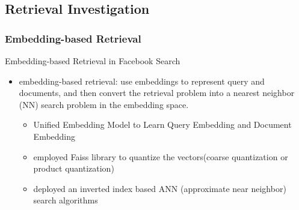 \documentclass{beamer}
\begin{document}
\subsection{Retrieval Investigation}
\subsubsection{Embedding-based Retrieval}

\begin{frame}{Embedding-based Retrieval in Facebook Search}
    \begin{itemize}
    \item embedding-based retrieval: use embeddings to represent query and documents, and then convert the retrieval problem into a nearest neighbor (NN) search problem in the embedding space.
        \begin{itemize} 
            \item Unified Embedding Model to Learn Query Embedding and Document Embedding
            \item employed Faiss library to quantize the vectors(coarse quantization or  product quantization)
            \item deployed an inverted index based ANN (approximate near neighbor) search algorithms
        \end{itemize}
    \end{itemize}
\end{frame}
\end{document}
